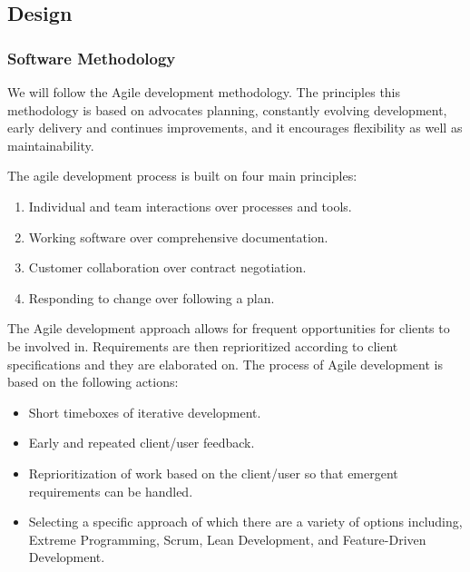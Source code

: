 \subsection{Design}

	\subsubsection{Software Methodology}
	We will follow the Agile development methodology. The principles this methodology is based on advocates planning, constantly evolving development, early delivery and continues improvements, and it encourages flexibility as well as maintainability.

	\begin{flushleft}
	The agile development process is built on four main principles:
		\begin{enumerate}
			\item Individual and team interactions over processes and tools.
			\item Working software over comprehensive documentation.
			\item Customer collaboration over contract negotiation.
			\item Responding to change over following a plan.
		\end{enumerate}
	\end{flushleft}

\begin{flushleft}

The Agile development approach allows for frequent opportunities for clients to be involved in. Requirements are then reprioritized according to client specifications and they are elaborated on. The process of Agile development is based on the following actions:

\end{flushleft}

    \begin{itemize}
			\item Short timeboxes of iterative development.
			\item Early and repeated client/user feedback.
			\item Reprioritization of work based on the client/user so that emergent requirements can be handled.
			\item Selecting a specific approach of which there are a variety of options including, Extreme Programming, Scrum, Lean Development, and Feature-Driven Development.
		\end{itemize}

